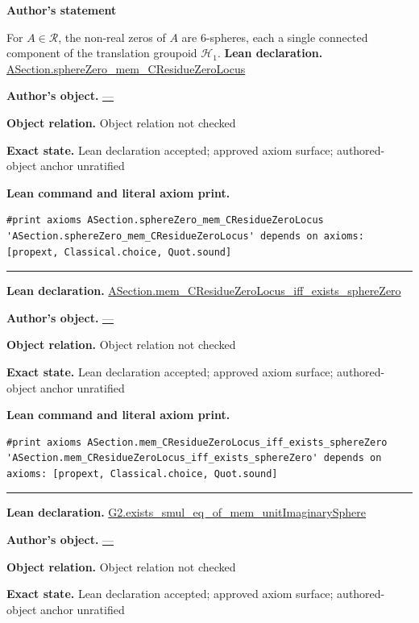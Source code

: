 \documentclass[11pt]{article}
\theoremstyle{plain}
\theoremstyle{definition}
\theoremstyle{remark}
\begin{document}
\medskip
\begin{tcolorbox}[provenancecard,title={42. Lemma - Residue-\$\textbackslash{}CC\$ zeros are \$6\$-sphere components of \$\textbackslash{}mathcal H\_1\$},title after break={42. Lemma - Residue-\$\textbackslash{}CC\$ zeros are \$6\$-sphere components of \$\textbackslash{}mathcal H\_1\$ (continued)}]
\textbf{Author's statement}\par
For $A\in\mathcal R$, the non-real zeros of $A$ are $6$-spheres, each a single connected
component of the translation groupoid $\mathcal H_1$.
\tcblower
\textbf{Lean declaration.} \url{ASection.sphereZero_mem_CResidueZeroLocus}
\par\textbf{Author's object.} \url{—}
\par\textbf{Object relation.} Object relation not checked
\par\textbf{Exact state.} Lean declaration accepted; approved axiom surface; authored-object anchor unratified
\par\smallskip\textbf{Lean command and literal axiom print.}
\begin{Verbatim}[breaklines=true,breakanywhere=true,fontsize=\small]
#print axioms ASection.sphereZero_mem_CResidueZeroLocus
'ASection.sphereZero_mem_CResidueZeroLocus' depends on axioms: [propext, Classical.choice, Quot.sound]
\end{Verbatim}
\medskip\hrule\medskip
\textbf{Lean declaration.} \url{ASection.mem_CResidueZeroLocus_iff_exists_sphereZero}
\par\textbf{Author's object.} \url{—}
\par\textbf{Object relation.} Object relation not checked
\par\textbf{Exact state.} Lean declaration accepted; approved axiom surface; authored-object anchor unratified
\par\smallskip\textbf{Lean command and literal axiom print.}
\begin{Verbatim}[breaklines=true,breakanywhere=true,fontsize=\small]
#print axioms ASection.mem_CResidueZeroLocus_iff_exists_sphereZero
'ASection.mem_CResidueZeroLocus_iff_exists_sphereZero' depends on axioms: [propext, Classical.choice, Quot.sound]
\end{Verbatim}
\medskip\hrule\medskip
\textbf{Lean declaration.} \url{G2.exists_smul_eq_of_mem_unitImaginarySphere}
\par\textbf{Author's object.} \url{—}
\par\textbf{Object relation.} Object relation not checked
\par\textbf{Exact state.} Lean declaration accepted; approved axiom surface; authored-object anchor unratified

\end{tcolorbox}
\end{document}
